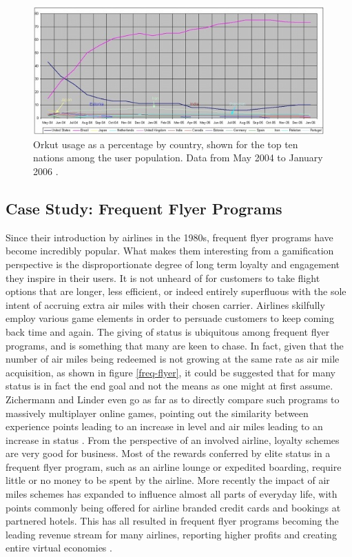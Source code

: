 \documentclass[12pt,a4paper,twoside]{report}
\begin{document}
\begin{figure}
\begin{center}
	\includegraphics{../img/orkut-brazil.jpg}
	\caption{Orkut usage as a percentage by country, shown for the top ten nations among the user population. Data from May 2004 to January 2006 \cite{fragoso2006wtf}.}
	\label{orkut-brazil}
\end{center}
\end{figure}

\subsection{Case Study: Frequent Flyer Programs}
Since their introduction by airlines in the 1980s, frequent flyer programs have become incredibly popular. What makes them interesting from a gamification perspective is the disproportionate degree of long term loyalty and engagement they inspire in their users. It is not unheard of for customers to take flight options that are longer, less efficient, or indeed entirely superfluous with the sole intent of accruing extra air miles with their chosen carrier. Airlines skilfully employ various game elements in order to persuade customers to keep coming back time and again. The giving of status is ubiquitous among frequent flyer programs, and is something that many are keen to chase. In fact, given that the number of air miles being redeemed is not growing at the same rate as air mile acquisition, as shown in figure \ref{freq-flyer}, it could be suggested that for many status is in fact the end goal and not the means as one might at first assume. Zichermann and Linder even go as far as to directly compare such programs to massively multiplayer online games, pointing out the similarity between experience points leading to an increase in level and air miles leading to an increase in status \cite{zichermann2010game}. From the perspective of an involved airline, loyalty schemes are very good for business. Most of the rewards conferred by elite status in a frequent flyer program, such as an airline lounge or expedited boarding, require little or no money to be spent by the airline. More recently the impact of air miles schemes has expanded to influence almost all parts of everyday life, with points commonly being offered for airline branded credit cards and bookings at partnered hotels. This has all resulted in frequent flyer programs becoming the leading revenue stream for many airlines, reporting higher profits and creating entire virtual economies \cite{zichermann2010game}.
\end{document}
